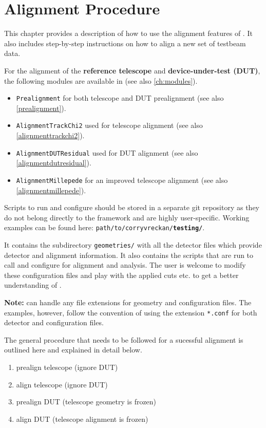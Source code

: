 \chapter{Alignment Procedure}
\label{ch:howtoalign}

This chapter provides a description of how to use the alignment features of \corry. 
It also includes step-by-step instructions on how to align a new set of testbeam data.

For the alignment of the \textbf{reference telescope} and \textbf{device-under-test (DUT)}, the following modules are available in \corry (see also \ref{ch:modules}).
\begin{itemize}
\item \texttt{Prealignment} for both telescope and DUT prealignment (see also \ref{prealignment}).
\item \texttt{AlignmentTrackChi2} used for telescope alignment (see also \ref{alignmenttrackchi2}).
\item \texttt{AlignmentDUTResidual} used for DUT alignment (see also \ref{alignmentdutresidual}).
\item \texttt{AlignmentMillepede} for an improved telescope alignment (see also \ref{alignmentmillepede}).
\end{itemize}

Scripts to run and configure \corry should be stored in a separate git repository as they do not belong directly to the \corry framework and are highly user-specific.
Working examples can be found here: \texttt{path/to/corryvreckan/\textbf{testing/}}.

It contains the subdirectory \texttt{geometries/} with all the detector files which provide detector and alignment information.
It also contains the scripts that are run to call and configure \corry for alignment and analysis.
The user is welcome to modify these configuration files and play with the applied cuts etc. to get a better understanding of \corry.

\textbf{Note:} \corry can handle any file extensions for geometry and configuration files. The examples, however, follow the convention of using the extension \texttt{*.conf} for both detector and configuration files.

The general procedure that needs to be followed for a sucessful alignment is outlined here and explained in detail below.
\begin{enumerate}
\item prealign telescope (ignore DUT)
\item align telescope (ignore DUT)
\item prealign DUT (telescope geometry is frozen)
\item align DUT (telescope alignment is frozen)
\end{enumerate}

